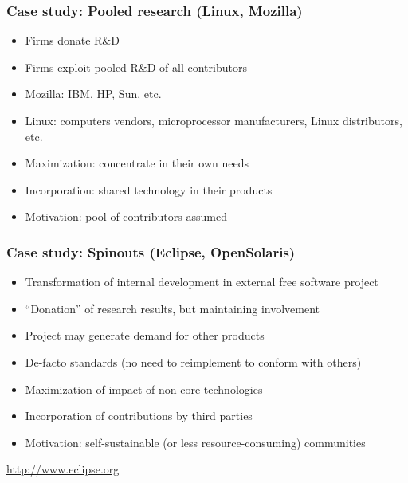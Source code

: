 
\begin{frame}
\frametitle{Case study: Pooled research (Linux, Mozilla)}

\begin{itemize}
\item Firms donate R\&D
\item Firms exploit pooled R\&D of all contributors
\item Mozilla: IBM, HP, Sun, etc.
\item Linux: computers vendors, microprocessor manufacturers, Linux distributors, etc.
\item Maximization: concentrate in their own needs
\item Incorporation: shared technology in their products
\item Motivation: pool of contributors assumed
\end{itemize}

\end{frame}


\begin{frame}
\frametitle{Case study: Spinouts (Eclipse, OpenSolaris)}

\begin{itemize}
\item Transformation of internal development in external free software project
\item ``Donation'' of research results, but maintaining involvement
\item Project may generate demand for other products
\item De-facto standards (no need to reimplement to conform with others)
\item Maximization of impact of non-core technologies
\item Incorporation of contributions by third parties
\item Motivation: self-sustainable (or less resource-consuming) communities
\end{itemize}

\begin{flushright}
\url{http://www.eclipse.org}
\end{flushright}
\end{frame}


